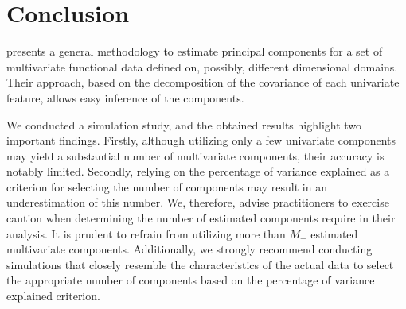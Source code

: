 
\section{Conclusion} %
\label{sec:conclusion}

\cite{happMultivariateFunctionalPrincipal2018} presents a general methodology to estimate principal components for a set of multivariate functional data defined on, possibly, different dimensional domains. Their approach, based on the decomposition of the covariance of each univariate feature, allows easy inference of the components.

We conducted a simulation study, and the obtained results highlight two important findings. Firstly, although utilizing only a few univariate components may yield a substantial number of multivariate components, their accuracy is notably limited. Secondly, relying on the percentage of variance explained as a criterion for selecting the number of components may result in an underestimation of this number. We, therefore, advise practitioners to exercise caution when determining the number of estimated components require in their analysis. It is prudent to refrain from utilizing more than $M_{-}$ estimated multivariate components. Additionally, we strongly recommend conducting simulations that closely resemble the characteristics of the actual data to select the appropriate number of components based on the percentage of variance explained criterion.






